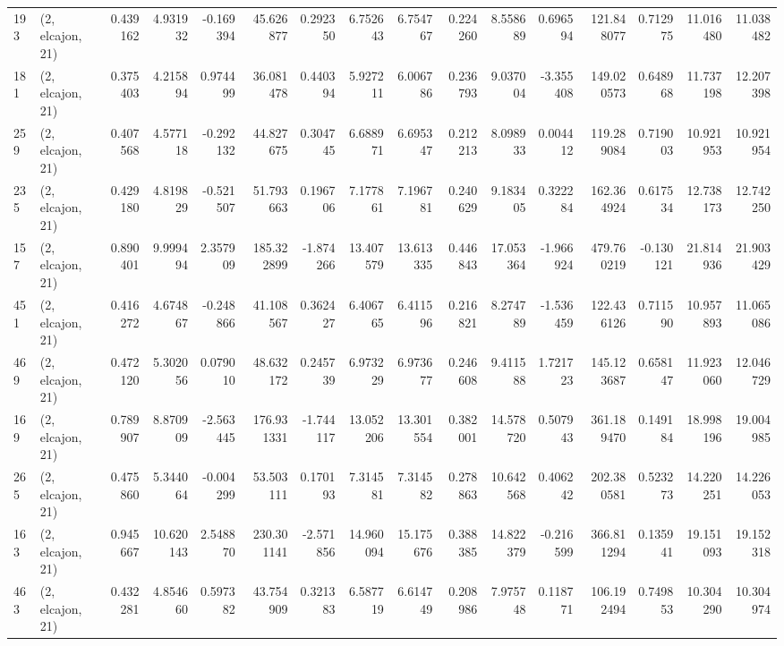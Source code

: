\begin{tabular}{llrrrrrrrrrrrrrr}
193 &  (2, elcajon, 21) &   0.439162 &   4.931932 &  -0.169394 &    45.626877 &   0.292350 &   6.752643 &   6.754767 &  0.224260 &   8.558689 &   0.696594 &   121.848077 &   0.712975 &  11.016480 &  11.038482 \\
181 &  (2, elcajon, 21) &   0.375403 &   4.215894 &   0.974499 &    36.081478 &   0.440394 &   5.927211 &   6.006786 &  0.236793 &   9.037004 &  -3.355408 &   149.020573 &   0.648968 &  11.737198 &  12.207398 \\
259 &  (2, elcajon, 21) &   0.407568 &   4.577118 &  -0.292132 &    44.827675 &   0.304745 &   6.688971 &   6.695347 &  0.212213 &   8.098933 &   0.004412 &   119.289084 &   0.719003 &  10.921953 &  10.921954 \\
235 &  (2, elcajon, 21) &   0.429180 &   4.819829 &  -0.521507 &    51.793663 &   0.196706 &   7.177861 &   7.196781 &  0.240629 &   9.183405 &   0.322284 &   162.364924 &   0.617534 &  12.738173 &  12.742250 \\
157 &  (2, elcajon, 21) &   0.890401 &   9.999494 &   2.357909 &   185.322899 &  -1.874266 &  13.407579 &  13.613335 &  0.446843 &  17.053364 &  -1.966924 &   479.760219 &  -0.130121 &  21.814936 &  21.903429 \\
451 &  (2, elcajon, 21) &   0.416272 &   4.674867 &  -0.248866 &    41.108567 &   0.362427 &   6.406765 &   6.411596 &  0.216821 &   8.274789 &  -1.536459 &   122.436126 &   0.711590 &  10.957893 &  11.065086 \\
469 &  (2, elcajon, 21) &   0.472120 &   5.302056 &   0.079010 &    48.632172 &   0.245739 &   6.973229 &   6.973677 &  0.246608 &   9.411588 &   1.721723 &   145.123687 &   0.658147 &  11.923060 &  12.046729 \\
169 &  (2, elcajon, 21) &   0.789907 &   8.870909 &  -2.563445 &   176.931331 &  -1.744117 &  13.052206 &  13.301554 &  0.382001 &  14.578720 &   0.507943 &   361.189470 &   0.149184 &  18.998196 &  19.004985 \\
265 &  (2, elcajon, 21) &   0.475860 &   5.344064 &  -0.004299 &    53.503111 &   0.170193 &   7.314581 &   7.314582 &  0.278863 &  10.642568 &   0.406242 &   202.380581 &   0.523273 &  14.220251 &  14.226053 \\
163 &  (2, elcajon, 21) &   0.945667 &  10.620143 &   2.548870 &   230.301141 &  -2.571856 &  14.960094 &  15.175676 &  0.388385 &  14.822379 &  -0.216599 &   366.811294 &   0.135941 &  19.151093 &  19.152318 \\
463 &  (2, elcajon, 21) &   0.432281 &   4.854660 &   0.597382 &    43.754909 &   0.321383 &   6.587719 &   6.614749 &  0.208986 &   7.975748 &   0.118771 &   106.192494 &   0.749853 &  10.304290 &  10.304974 \\

\end{tabular}
